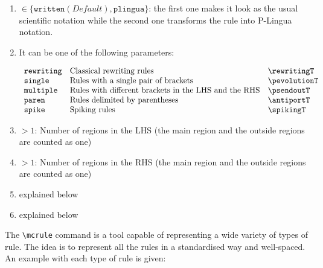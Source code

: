 \documentclass{article}
\begin{document}
\begin{enumerate}[label=\texttt{\#\arabic*}]
\item $\in \{\mathtt{written} (\mathit{Default}), \mathtt{plingua}\}$: the first one
  makes it look as the usual scientific notation while the second one
  transforms the rule into P-Lingua notation.
\item It can be one of the following parameters:
  
  $
  \begin{array}{lll}
    \mathtt{rewriting} & \mbox{Classical rewriting rules} & \rewritingT \\
    \mathtt{single} & \mbox{Rules with a single pair of brackets} & \pevolutionT \\
    \mathtt{multiple} & \mbox{Rules with different brackets in the LHS and the RHS} & \psendoutT \\
    \mathtt{paren} & \mbox{Rules delimited by parentheses} & \antiportT \\
    \mathtt{spike} & \mbox{Spiking rules} & \spikingT
  \end{array}
$
\item $> 1$: Number of regions in the LHS (the main region and the outside regions are counted as one)
\item $> 1$: Number of regions in the RHS (the main region and the outside regions are counted as one)
\item explained below
\item explained below
\end{enumerate}

The \verb=\mcrule= command is a tool capable of representing a wide
variety of types of rule. The idea is to represent all the rules in a
standardised way and well-spaced. An example with each type of rule is
given:
\end{document}
